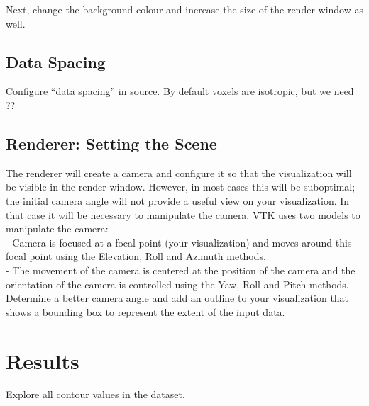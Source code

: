 \documentclass{article}
\begin{document}
Next, change the background colour and increase the size of the render window as well.

\subsection{Data Spacing}
Configure “data spacing” in source. By default voxels are isotropic, but we need ??

\subsection{Renderer: Setting the Scene}
The renderer will create a camera and configure it so that the visualization will be visible in the render window. However, in most cases this will be suboptimal; the
initial camera angle will not provide a useful view on your visualization. In that case it will be necessary to manipulate the camera. VTK uses two models to manipulate the camera:
\\ - Camera is focused at a focal point (your visualization) and moves around
this focal point using the Elevation, Roll and Azimuth methods.
\\ - The movement of the camera is centered at the position of the camera and the orientation of the camera is controlled using the Yaw, Roll and Pitch methods.
\\ Determine a better camera angle and add an outline to your visualization that shows a bounding box to represent the extent of the input data.

\section{Results}
Explore all contour values in the dataset. 
\end{document}
